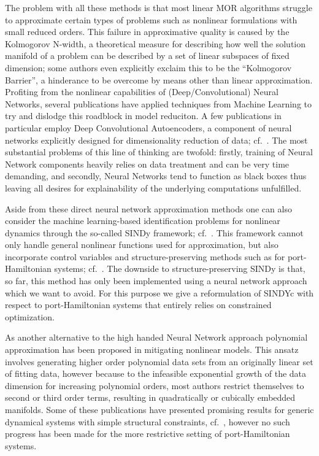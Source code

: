 The problem with all these methods is that most linear MOR algorithms struggle to approximate certain types of problems such as nonlinear formulations with small reduced orders.
This failure in approximative quality is caused by the Kolmogorov N-width, a theoretical measure for describing how well the solution manifold of a problem can be described by a set of linear subspaces of fixed dimension; some authors even explicitly exclaim this to be the ``Kolmogorov Barrier'', a hinderance to be overcome by means other than linear approximation.
Profiting from the nonlinear capabilities of (Deep/Convolutional) Neural Networks, several publications have applied techniques from Machine Learning to try and dislodge this roadblock in model reduciton.
A few publications in particular employ Deep Convolutional Autoencoders, a component of neural networks explicitly designed for dimensionality reduction of data; cf.~\cite{Lee2020, Benner2022, Romor2023, Buchfink2023}.
The most substantial problems of this line of thinking are twofold: firstly, training of Neural Network components heavily relies on data treatment and can be very time demanding, and secondly, Neural Networks tend to function as black boxes thus leaving all desires for explainability of the underlying computations unfulfilled.

Aside from these direct neural network approximation methods one can also consider the machine learning-based identification problems for nonlinear dynamics through the so-called \acs{SINDy} framework; cf.~\cite{Brunton2016, Kaheman2020}.
This framework cannot only handle general nonlinear functions used for approximation, but also incorporate control variables and structure-preserving methods such as for port-Hamiltonian systems; cf.~\cite{Kaiser2018, Lee2022}.
The downside to structure-preserving \acs{SINDy} is that, so far, this method has only been implemented using a neural network approach which we want to avoid.
For this purpose we give a reformulation of \acs{SINDYc} with respect to port-Hamiltonian systems that entirely relies on constrained optimization.

As another alternative to the high handed Neural Network approach polynomial approximation has been proposed in mitigating nonlinear models.
This ansatz involves generating higher order polynomial data sets from an originally linear set of fitting data, however because to the infeasible exponential growth of the data dimension for increasing polynomial orders, most authors restrict themselves to second or third order terms, resulting in quadratically or cubically embedded manifolds.
Some of these publications have presented promising results for generic dynamical systems with simple structural constraints, cf.~\cite{Gu2011, Peherstorfer2016, Jain2017, Rutzmoser2017, Kramer2019, BGK2020, BGH2020, Qian2020, Gosea2021, Barnett2022, Khodabakhshi2022, Qian2022, Geelen2023}, however no such progress has been made for the more restrictive setting of port-Hamiltonian systems.


